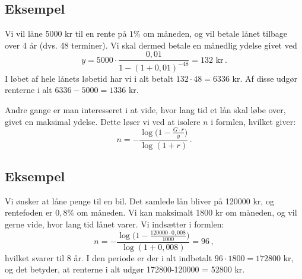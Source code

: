 \documentclass[12pt,oneside,a4paper]{article}
\begin{document}
\begin{tcolorbox}
\subsection{Eksempel}
Vi vil låne 5000 kr til en rente på $1 \%$ om måneden, og vil betale lånet tilbage over 
4 år (dvs. 48 terminer).
Vi skal dermed betale en månedlig ydelse givet ved
\[
    y = 5000\cdot\frac{0,01}{1-(1+0,01)^{-48}} = 132 \,\,\mbox {kr} \,. 
\]
I løbet af hele lånets løbetid har vi i alt betalt $132\cdot 48 = 6336$ kr. Af
disse udgør renterne i alt $6336-5000 = 1336$ kr.
\end{tcolorbox}

Andre gange er man interesseret i at vide, hvor lang tid et lån skal løbe over, givet
en maksimal ydelse. Dette løser vi ved at isolere $n$ i formlen, hvilket giver:
\[
    n = -\frac{\log\big(1-\frac{G\cdot r}{y}\big)}{\log(1+r)} \,.
\]

\begin{tcolorbox}
\subsection{Eksempel}
Vi ønsker at låne penge til en bil. Det samlede lån bliver på 120000 kr, og
rentefoden er $0,8\%$ om måneden. Vi kan maksimalt 1800 kr om måneden, og
vil gerne vide, hvor lang tid lånet varer.
Vi indsætter i formlen:
\[
n = -\frac{\log\big(1-\frac{120000\cdot0,008}{1000}\big)}{\log(1+0,008)} = 96 \,,
\]
hvilket svarer til 8 år.
I den periode er der i alt indbetalt $96\cdot 1800 = 172800$ kr, og det betyder,
at renterne i alt udgør 172800-120000 = 52800 kr.
\end{tcolorbox}
\end{document}
